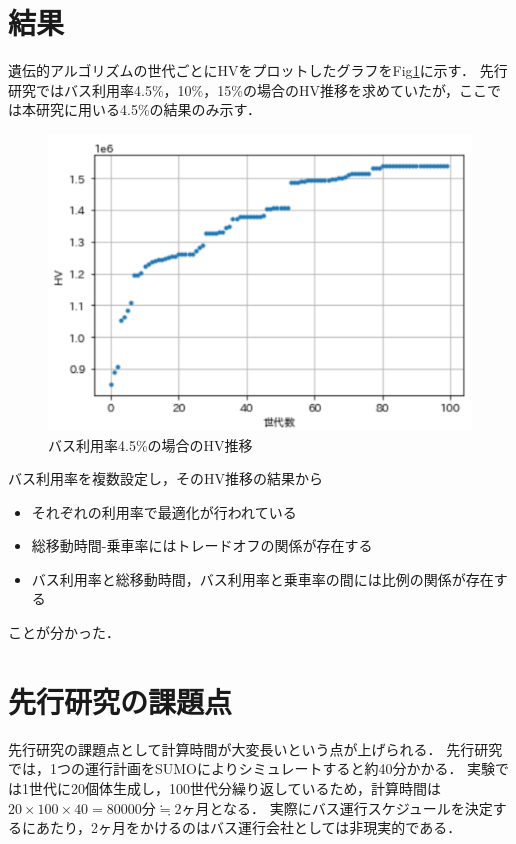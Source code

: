 \documentclass[main]{subfiles}
\begin{document}
    \section{結果}
    遺伝的アルゴリズムの世代ごとにHVをプロットしたグラフをFig\ref{hv_plot}に示す．
    先行研究ではバス利用率4.5\%，10\%，15\%の場合のHV推移を求めていたが，ここでは本研究に用いる4.5\%の結果のみ示す．

    \begin{figure}
        \centering
        \includegraphics[width=\linewidth]{figures/hv_plot.png}
        \caption{バス利用率4.5\%の場合のHV推移}
        \label{hv_plot}
    \end{figure}

    バス利用率を複数設定し，そのHV推移の結果から
    \begin{itemize}
        \item それぞれの利用率で最適化が行われている
        \item 総移動時間-乗車率にはトレードオフの関係が存在する
        \item バス利用率と総移動時間，バス利用率と乗車率の間には比例の関係が存在する
    \end{itemize}
    ことが分かった．

    \section{先行研究の課題点}
    先行研究の課題点として計算時間が大変長いという点が上げられる．
    先行研究では，1つの運行計画をSUMOによりシミュレートすると約40分かかる．
    実験では1世代に20個体生成し，100世代分繰り返しているため，計算時間は$20\times 100\times 40 = 80000分 \fallingdotseq 2ヶ月$となる．
    実際にバス運行スケジュールを決定するにあたり，2ヶ月をかけるのはバス運行会社としては非現実的である．
\end{document}
